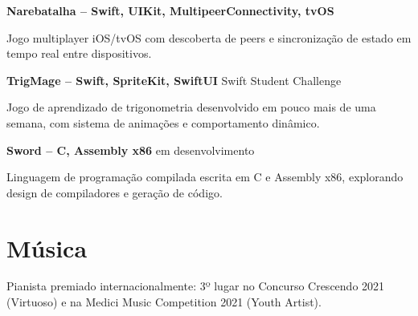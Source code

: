 \documentclass[11pt,a4paper]{article}
\newcommand{\entrysimple}[2]{%
  \textbf{#1} \hfill {\color{muted}#2}\par\vspace{2pt}}
\begin{document}
\entrysimple{Narebatalha \textnormal{\color{muted}-- Swift, UIKit, MultipeerConnectivity, tvOS}}{}
Jogo multiplayer iOS/tvOS com descoberta de peers e sincronização de estado em tempo real entre dispositivos.
\vspace{2pt}

\entrysimple{TrigMage \textnormal{\color{muted}-- Swift, SpriteKit, SwiftUI}}{Swift Student Challenge}
Jogo de aprendizado de trigonometria desenvolvido em pouco mais de uma semana, com sistema de animações e comportamento dinâmico.
\vspace{2pt}

\entrysimple{Sword \textnormal{\color{muted}-- C, Assembly x86}}{em desenvolvimento}
Linguagem de programação compilada escrita em C e Assembly x86, explorando design de compiladores e geração de código.

\enlargethispage{2\baselineskip}
\section{Música}
Pianista premiado internacionalmente: 3º lugar no Concurso Crescendo 2021 (Virtuoso) e na Medici Music Competition 2021 (Youth Artist).
\end{document}
